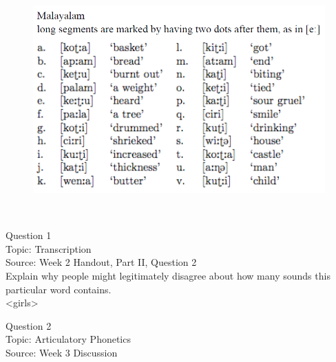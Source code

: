 \documentclass[12pt]{article}
\begin{document}
\begin{figure}[H]
\includegraphics{../images/malayalam.png}
\end{figure}

\newpage

\begin{center}
\textbf{{\color{red}{\HUGE END OF EXAM}}}\\

\end{center}
\newpage

\begin{center}
\textbf{{\color{blue}{\HUGE START OF EXAM\\}}}

\textbf{{\color{blue}{\HUGE Student ID: 51557\\}}}

\textbf{{\color{blue}{\HUGE \\}}}

\end{center}
\newpage

{\large Question 1}\\

Topic: Transcription\\
Source: Week 2 Handout, Part II, Question 2\\

Explain why people might legitimately disagree about how many sounds this particular word contains.\\

<girls>


\newpage

{\large Question 2}\\

Topic: Articulatory Phonetics\\
Source: Week 3 Discussion\\
\end{document}
